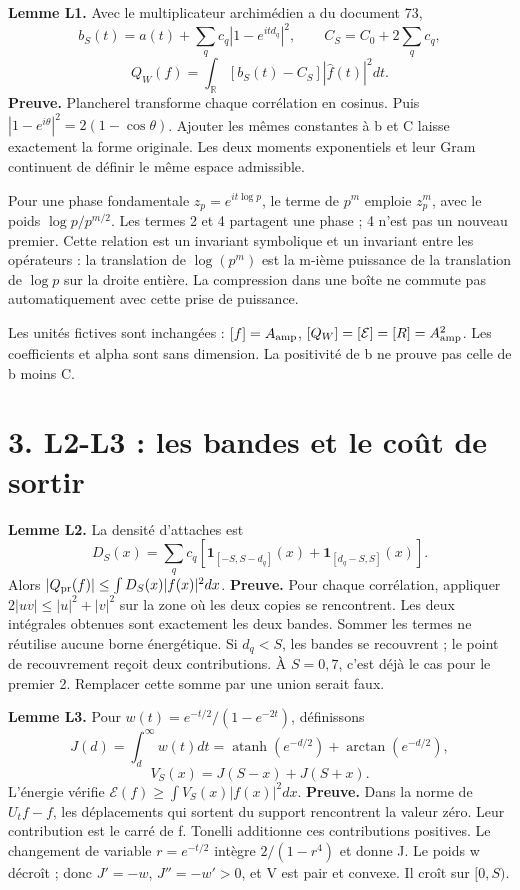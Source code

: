 \documentclass[
  10pt,
  a4paper,
]{article}
\begin{document}
\textbf{Lemme L1.} Avec le multiplicateur archimédien a du document 73,
\[
b_S(t)=a(t)+\sum_q c_q|1-e^{itd_q}|^2,\qquad
C_S=C_0+2\sum_q c_q,
\] \[
Q_W(f)=\int_{\mathbb R}[b_S(t)-C_S]|\widehat f(t)|^2dt.
\] \textbf{Preuve.} Plancherel transforme chaque corrélation en cosinus.
Puis \(|1-e^{i\theta}|^2=2(1-\cos\theta)\). Ajouter les mêmes constantes
à b et C laisse exactement la forme originale. Les deux moments
exponentiels et leur Gram continuent de définir le même espace
admissible.

Pour une phase fondamentale \(z_p=e^{it\log p}\), le terme de \(p^m\)
emploie \(z_p^m\), avec le poids \(\log p/p^{m/2}\). Les termes 2 et 4
partagent une phase ; 4 n'est pas un nouveau premier. Cette relation est
un invariant symbolique et un invariant entre les opérateurs : la
translation de \(\log(p^m)\) est la m-ième puissance de la translation
de \(\log p\) sur la droite entière. La compression dans une boîte ne
commute pas automatiquement avec cette prise de puissance.

Les unités fictives sont inchangées : \([f]=A_{\rm amp}\),
\([Q_W]=[\mathcal E]=[R]=A_{\rm amp}^2\). Les coefficients et alpha sont
sans dimension. La positivité de b ne prouve pas celle de b moins C.

\hypertarget{l2-l3-les-bandes-et-le-couxfbt-de-sortir}{%
\section{3. L2-L3 : les bandes et le coût de
sortir}\label{l2-l3-les-bandes-et-le-couxfbt-de-sortir}}

\textbf{Lemme L2.} La densité d'attaches est \[
D_S(x)=\sum_q c_q\left[
\mathbf1_{[-S,S-d_q]}(x)+\mathbf1_{[d_q-S,S]}(x)\right].
\] Alors \(|Q_{\rm pr}(f)|\le\int D_S(x)|f(x)|^2dx\). \textbf{Preuve.}
Pour chaque corrélation, appliquer \(2|uv|\le|u|^2+|v|^2\) sur la zone
où les deux copies se rencontrent. Les deux intégrales obtenues sont
exactement les deux bandes. Sommer les termes ne réutilise aucune borne
énergétique. Si \(d_q<S\), les bandes se recouvrent ; le point de
recouvrement reçoit deux contributions. À \(S=0,7\), c'est déjà le cas
pour le premier 2. Remplacer cette somme par une union serait faux.

\textbf{Lemme L3.} Pour \(w(t)=e^{-t/2}/(1-e^{-2t})\), définissons \[
J(d)=\int_d^\infty w(t)dt
=\operatorname{atanh}(e^{-d/2})+\arctan(e^{-d/2}),
\] \[
V_S(x)=J(S-x)+J(S+x).
\] L'énergie vérifie \(\mathcal E(f)\ge\int V_S(x)|f(x)|^2dx\).
\textbf{Preuve.} Dans la norme de \(U_tf-f\), les déplacements qui
sortent du support rencontrent la valeur zéro. Leur contribution est le
carré de f. Tonelli additionne ces contributions positives. Le
changement de variable \(r=e^{-t/2}\) intègre \(2/(1-r^4)\) et donne J.
Le poids w décroît ; donc \(J'=-w\), \(J''=-w'>0\), et V est pair et
convexe. Il croît sur \([0,S)\).
\end{document}
